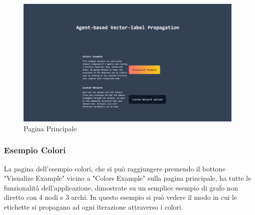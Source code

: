 \documentclass[a4paper,12pt]{report}
\begin{document}
			\begin{center}
			\begin{figure}[H]
			\centering
			\includegraphics[width=0.9\linewidth,keepaspectratio]{paginaprincipale}
			\caption{Pagina Principale}
			\end{figure}
			\end{center}

			\subsubsection{Esempio Colori}

			La pagina dell'esempio colori, che si può raggiungere premendo il bottone "Visualize Example" vicino a "Colors Example" sulla pagina principale, ha tutte le funzionalità dell'applicazione, dimostrate su un semplice esempio di grafo non diretto con 4 nodi e 3 archi. In questo esempio si può vedere il modo in cui le etichette si propagano ad ogni iterazione attraverso i colori. 
\end{document}
